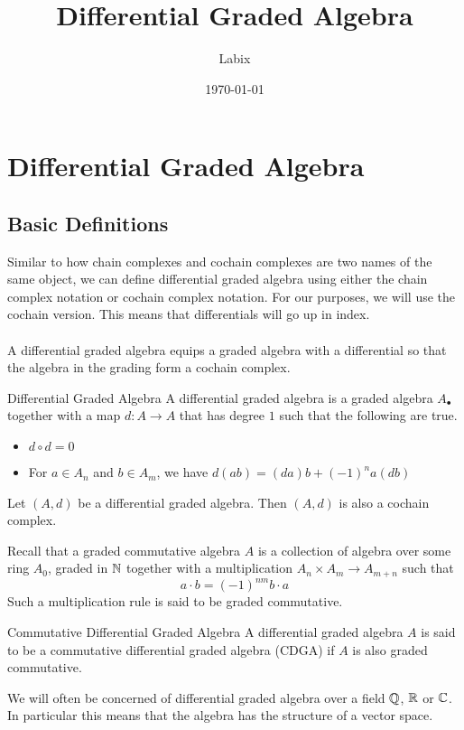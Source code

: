 \documentclass[a4paper]{article}
\title{Differential Graded Algebra}
\author{Labix}
\date{\today}
\begin{document}
\maketitle
\begin{abstract}
\end{abstract}
\pagebreak
\tableofcontents

\pagebreak

\section{Differential Graded Algebra}
\subsection{Basic Definitions}
Similar to how chain complexes and cochain complexes are two names of the same object, we can define differential graded algebra using either the chain complex notation or cochain complex notation. For our purposes, we will use the cochain version. This means that differentials will go up in index. \\~\\

A differential graded algebra equips a graded algebra with a differential so that the algebra in the grading form a cochain complex. 

\begin{defn}{Differential Graded Algebra}{} A differential graded algebra is a graded algebra $A_\bullet$ together with a map $d:A\to A$ that has degree $1$ such that the following are true. 
\begin{itemize}
\item $d\circ d=0$
\item For $a\in A_n$ and $b\in A_m$, we have $d(ab)=(da)b+(-1)^na(db)$
\end{itemize}
\end{defn}

\begin{lmm}{}{} Let $(A,d)$ be a differential graded algebra. Then $(A,d)$ is also a cochain complex. 
\end{lmm}

Recall that a graded commutative algebra $A$ is a collection of algebra over some ring $A_0$, graded in $\mathbb{N}$ together with a multiplication $A_n\times A_m\to A_{m+n}$ such that $$a\cdot b=(-1)^{nm}b\cdot a$$ Such a multiplication rule is said to be graded commutative. 

\begin{defn}{Commutative Differential Graded Algebra}{} A differential graded algebra $A$ is said to be a commutative differential graded algebra (CDGA) if $A$ is also graded commutative. 
\end{defn}

We will often be concerned of differential graded algebra over a field $\mathbb{Q}$, $\mathbb{R}$ or $\mathbb{C}$. In particular this means that the algebra has the structure of a vector space. 
\end{document}
